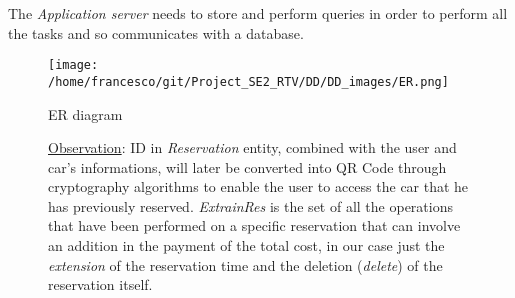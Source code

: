 \documentclass[10pt, a4paper,titlepage]{article}
\begin{document}
The \emph{Application server} needs to store and perform queries in order to perform all the tasks and so communicates with a database.
\clearpage
\begin{figure}[h]
\begin{center}
\texttt{[image: /home/francesco/git/Project\_SE2\_RTV/DD/DD\_images/ER.png]}
\end{center}
\caption{ER diagram}
\caption*{\underline{Observation}: ID in \emph{Reservation} entity, combined with the user and car's informations, will later be converted into QR Code through cryptography algorithms to enable the user to access the car that he has previously reserved. \emph{ExtrainRes} is the set of all the operations that have been performed on a specific reservation that can involve an addition in the payment of the total cost, in our case just the \emph{extension} of the reservation time and the deletion (\emph{delete}) of the reservation itself.}
\label{fig:ER}
\end{figure}
\clearpage
\end{document}
